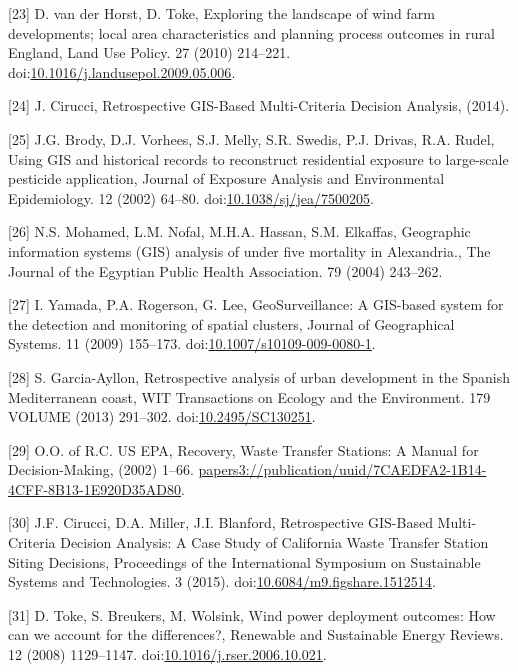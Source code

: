 \documentclass[a4paper,]{article}
\theoremstyle{definition}
\theoremstyle{definition}
\theoremstyle{definition}
\theoremstyle{remark}
\begin{document}
\hypertarget{ref-VanderHorst2010}{}
{[}23{]} D. van der Horst, D. Toke, Exploring the landscape of wind farm
developments; local area characteristics and planning process outcomes
in rural England, Land Use Policy. 27 (2010) 214--221.
doi:\href{https://doi.org/10.1016/j.landusepol.2009.05.006}{10.1016/j.landusepol.2009.05.006}.

\hypertarget{ref-Cirucci2014}{}
{[}24{]} J. Cirucci, Retrospective GIS-Based Multi-Criteria Decision
Analysis, (2014).

\hypertarget{ref-Brody2002}{}
{[}25{]} J.G. Brody, D.J. Vorhees, S.J. Melly, S.R. Swedis, P.J. Drivas,
R.A. Rudel, Using GIS and historical records to reconstruct residential
exposure to large-scale pesticide application, Journal of Exposure
Analysis and Environmental Epidemiology. 12 (2002) 64--80.
doi:\href{https://doi.org/10.1038/sj/jea/7500205}{10.1038/sj/jea/7500205}.

\hypertarget{ref-Mohamed2004}{}
{[}26{]} N.S. Mohamed, L.M. Nofal, M.H.A. Hassan, S.M. Elkaffas,
Geographic information systems (GIS) analysis of under five mortality in
Alexandria., The Journal of the Egyptian Public Health Association. 79
(2004) 243--262.

\hypertarget{ref-Yamada2009}{}
{[}27{]} I. Yamada, P.A. Rogerson, G. Lee, GeoSurveillance: A GIS-based
system for the detection and monitoring of spatial clusters, Journal of
Geographical Systems. 11 (2009) 155--173.
doi:\href{https://doi.org/10.1007/s10109-009-0080-1}{10.1007/s10109-009-0080-1}.

\hypertarget{ref-Garcia-Ayllon2013}{}
{[}28{]} S. Garcia-Ayllon, Retrospective analysis of urban development
in the Spanish Mediterranean coast, WIT Transactions on Ecology and the
Environment. 179 VOLUME (2013) 291--302.
doi:\href{https://doi.org/10.2495/SC130251}{10.2495/SC130251}.

\hypertarget{ref-USEPA2002}{}
{[}29{]} O.O. of R.C. US EPA, Recovery, Waste Transfer Stations: A
Manual for Decision-Making, (2002) 1--66.
\url{papers3://publication/uuid/7CAEDFA2-1B14-4CFF-8B13-1E920D35AD80}.

\hypertarget{ref-Cirucci2015}{}
{[}30{]} J.F. Cirucci, D.A. Miller, J.I. Blanford, Retrospective
GIS-Based Multi-Criteria Decision Analysis: A Case Study of California
Waste Transfer Station Siting Decisions, Proceedings of the
International Symposium on Sustainable Systems and Technologies. 3
(2015).
doi:\href{https://doi.org/10.6084/m9.figshare.1512514}{10.6084/m9.figshare.1512514}.

\hypertarget{ref-Toke2008}{}
{[}31{]} D. Toke, S. Breukers, M. Wolsink, Wind power deployment
outcomes: How can we account for the differences?, Renewable and
Sustainable Energy Reviews. 12 (2008) 1129--1147.
doi:\href{https://doi.org/10.1016/j.rser.2006.10.021}{10.1016/j.rser.2006.10.021}.
\end{document}
